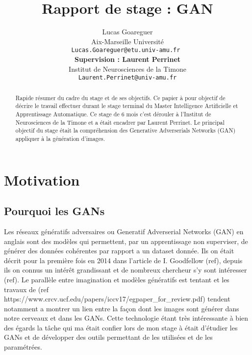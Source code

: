 \documentclass[11pt]{article}
\title{Rapport de stage : GAN}
\author{Lucas Goareguer \\
  Aix-Marseille Université \\
  \texttt{Lucas.Goareguer@etu.univ-amu.fr   } \\\And
   {\bf Supervision : Laurent Perrinet} \\
  Institut de Neurosciences de la Timone \\
  {\tt Laurent.Perrinet@univ-amu.fr} \\}
\date{}
\begin{document}
\maketitle
\begin{abstract}
Rapide résumer du cadre du stage et de ses objectifs.
Ce papier à pour objectif de décrire le travail effectuer durant le stage terminal du Master Intelligence Artificielle et Apprentissage Automatique.
Ce stage de 6 mois c'est dérouler à l'Institut de Neurosciences de la Timone et a était encadrer par Laurent Perrinet.
Le principal objectif du stage était la compréhension des Generative Adverserials Networks (GAN) appliquer à la génération d'images.
\end{abstract}


\section{Motivation}

\subsection{Pourquoi les GANs}
Les réseaux génératifs adversaires ou Generatif Adverserial Networks (GAN) en anglais sont des modèles qui permettent, par un apprentissage non superviser, de générer des données cohérentes par rapport a un dataset donnée. Ils on était décrit pour la première fois en 2014 dans l'article de I. Goodfellow (ref), depuis ils on connus un intérêt grandissant et de nombreux chercheur s'y sont intéresser (ref). 
Le parallèle entre imagination et modèles génératifs est tentant et les travaux de (ref https://www.crcv.ucf.edu/papers/iccv17/egpaper_for_review.pdf) tendent notamment a montrer un lien entre la façon dont les images sont générer dans notre cerveaux et dans les GANs. 
Cette technologie étant très intéressante à bien des égards la tâche qui ma était confier lors de mon stage à était d'étudier les GANs et de développer des outils permettant de les utilisées et de les paramétrées. 
\end{document}
